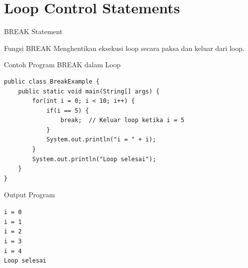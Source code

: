\documentclass{beamer}
\begin{document}
\section{Loop Control Statements}
\begin{frame}[fragile]{BREAK Statement}
\vspace{-0.25cm}
  \begin{block}{Fungsi BREAK}
  \vspace{-0.2cm}
    Menghentikan eksekusi loop secara paksa dan keluar dari loop.
  \end{block}
  \begin{exampleblock}{Contoh Program BREAK dalam Loop}
    \begin{lstlisting}[basicstyle=\ttfamily\tiny]
public class BreakExample {
    public static void main(String[] args) {
        for(int i = 0; i < 10; i++) {
            if(i == 5) {
                break;  // Keluar loop ketika i = 5
            }
            System.out.println("i = " + i);
        }
        System.out.println("Loop selesai");
    }
}
    \end{lstlisting}
  \end{exampleblock}

  \vspace{-0.5cm}
  \begin{block}{Output Program}
  \vspace{-0.3cm}
    \colorbox{gray!20}{
      \parbox{0.9\textwidth}{
        \texttt{\tiny i = 0\\[-5pt]
        i = 1\\[-5pt]
        i = 2\\[-5pt]
        i = 3\\[-5pt]
        i = 4\\[-5pt]
        Loop selesai}
      }
    }
  \end{block}
\end{frame}
\end{document}
